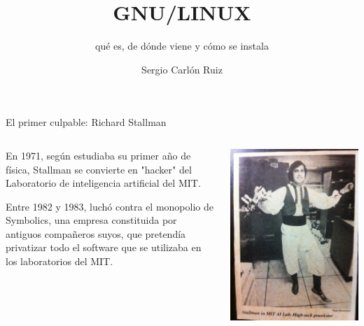 \documentclass{beamer}
\title[]{GNU/LINUX}
\subtitle{qué es, de dónde viene y cómo se instala} %
\author{Sergio Carlón Ruiz}
\institute{Grupo universitario de Informática} %
\begin{document}
\begin{frame}
\titlepage
\end{frame}

\begin{frame}{El primer culpable: Richard Stallman}
  \begin{columns}[T]
    \begin{column}{.5\textwidth}
     En 1971, según estudiaba su primer año de física, Stallman 
     se convierte en "hacker" 
     del Laboratorio de inteligencia artificial del MIT.
 	
 	Entre 1982 y 1983, luchó contra el monopolio de Symbolics, una empresa constituida por antiguos compañeros suyos, que pretendía privatizar todo el software que se utilizaba en los laboratorios del MIT.

    \end{column}
    \begin{column}{.5\textwidth}
    \includegraphics[width=\textwidth]{stallman_joven.jpg}
    \end{column}
  \end{columns}
\end{frame}
\end{document}
